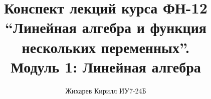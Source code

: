 \documentclass[a4paper]{article}
\title{Конспект лекций курса ФН-12 \\ ``Линейная алгебра и функция нескольких переменных''. \\ Модуль 1: Линейная алгебра}
\author{Жихарев Кирилл ИУ7-24Б}
\date{ }
\begin{document}
  \maketitle
  \pagebreak

  \tableofcontents
  \pagebreak

  
  
  
\end{document}

